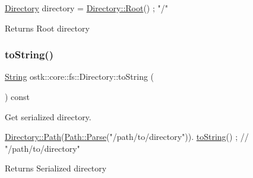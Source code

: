 \begin{DoxyCode}
\hyperlink{classostk_1_1core_1_1fs_1_1_directory_adc893e10f55282be0d0455e9cfc5796b}{Directory} directory = \hyperlink{classostk_1_1core_1_1fs_1_1_directory_a0e6db71e5632f6b0ea4ad3fabd4c00db}{Directory::Root}() ; \textcolor{stringliteral}{"/"}
\end{DoxyCode}


\begin{DoxyReturn}{Returns}
Root directory 
\end{DoxyReturn}
\mbox{\label{classostk_1_1core_1_1fs_1_1_directory_a74bae41feb864f140298845b2dff432c}} 
\subsubsection{\texorpdfstring{to\+String()}{toString()}}
{\footnotesize\ttfamily \hyperlink{classostk_1_1core_1_1types_1_1_string}{String} ostk\+::core\+::fs\+::\+Directory\+::to\+String (\begin{DoxyParamCaption}{ }\end{DoxyParamCaption}) const}



Get serialized directory. 


\begin{DoxyCode}
\hyperlink{classostk_1_1core_1_1fs_1_1_directory_a0151dba2940d5f426b52209dc7dab2e5}{Directory::Path}(\hyperlink{classostk_1_1core_1_1fs_1_1_path_ad08539ba654f5df11c4bcb07276345ad}{Path::Parse}(\textcolor{stringliteral}{"/path/to/directory"})).
      \hyperlink{classostk_1_1core_1_1fs_1_1_directory_a74bae41feb864f140298845b2dff432c}{toString}() ; \textcolor{comment}{// "/path/to/directory"}
\end{DoxyCode}


\begin{DoxyReturn}{Returns}
Serialized directory 
\end{DoxyReturn}
\mbox{\label{classostk_1_1core_1_1fs_1_1_directory_a1ead445a6b0f2b020ab61c2653bb8faa}} 
